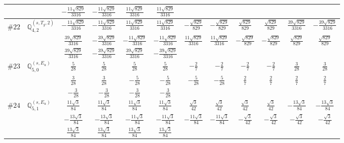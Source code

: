 \documentclass[fleqn,9pt,landscape]{jsarticle}
\begin{document}
\begin{center}
\begin{longtable}{lcccccccccc}
& $ - \frac{11 \sqrt{829}}{3316} $ & $ - \frac{11 \sqrt{829}}{3316} $ & $ \frac{11 \sqrt{829}}{3316} $ & $ \frac{11 \sqrt{829}}{3316} $ & $  $ & $  $ & $  $ & $  $ & $  $ & $  $ \\ \hline
$ \#22\quad \mathbb{Q}_{4,2}^{(s,T_{g},2)} $ & $ - \frac{11 \sqrt{829}}{3316} $ & $ - \frac{11 \sqrt{829}}{3316} $ & $ \frac{11 \sqrt{829}}{3316} $ & $ \frac{11 \sqrt{829}}{3316} $ & $ - \frac{\sqrt{829}}{829} $ & $ - \frac{\sqrt{829}}{829} $ & $ \frac{\sqrt{829}}{829} $ & $ \frac{\sqrt{829}}{829} $ & $ \frac{39 \sqrt{829}}{3316} $ & $ - \frac{39 \sqrt{829}}{3316} $ \\
& $ \frac{39 \sqrt{829}}{3316} $ & $ - \frac{39 \sqrt{829}}{3316} $ & $ - \frac{11 \sqrt{829}}{3316} $ & $ - \frac{11 \sqrt{829}}{3316} $ & $ \frac{11 \sqrt{829}}{3316} $ & $ \frac{11 \sqrt{829}}{3316} $ & $ - \frac{\sqrt{829}}{829} $ & $ - \frac{\sqrt{829}}{829} $ & $ \frac{\sqrt{829}}{829} $ & $ \frac{\sqrt{829}}{829} $ \\
& $ \frac{39 \sqrt{829}}{3316} $ & $ - \frac{39 \sqrt{829}}{3316} $ & $ \frac{39 \sqrt{829}}{3316} $ & $ - \frac{39 \sqrt{829}}{3316} $ & $  $ & $  $ & $  $ & $  $ & $  $ & $  $ \\ \hline
$ \#23\quad \mathbb{Q}_{5,0}^{(s,E_{u})} $ & $ \frac{5}{28} $ & $ \frac{5}{28} $ & $ \frac{5}{28} $ & $ \frac{5}{28} $ & $ - \frac{2}{7} $ & $ - \frac{2}{7} $ & $ - \frac{2}{7} $ & $ - \frac{2}{7} $ & $ \frac{3}{28} $ & $ \frac{3}{28} $ \\
& $ \frac{3}{28} $ & $ \frac{3}{28} $ & $ - \frac{5}{28} $ & $ - \frac{5}{28} $ & $ - \frac{5}{28} $ & $ - \frac{5}{28} $ & $ \frac{2}{7} $ & $ \frac{2}{7} $ & $ \frac{2}{7} $ & $ \frac{2}{7} $ \\
& $ - \frac{3}{28} $ & $ - \frac{3}{28} $ & $ - \frac{3}{28} $ & $ - \frac{3}{28} $ & $  $ & $  $ & $  $ & $  $ & $  $ & $  $ \\ \hline
$ \#24\quad \mathbb{Q}_{5,1}^{(s,E_{u})} $ & $ \frac{11 \sqrt{3}}{84} $ & $ \frac{11 \sqrt{3}}{84} $ & $ \frac{11 \sqrt{3}}{84} $ & $ \frac{11 \sqrt{3}}{84} $ & $ \frac{\sqrt{3}}{42} $ & $ \frac{\sqrt{3}}{42} $ & $ \frac{\sqrt{3}}{42} $ & $ \frac{\sqrt{3}}{42} $ & $ - \frac{13 \sqrt{3}}{84} $ & $ - \frac{13 \sqrt{3}}{84} $ \\
& $ - \frac{13 \sqrt{3}}{84} $ & $ - \frac{13 \sqrt{3}}{84} $ & $ - \frac{11 \sqrt{3}}{84} $ & $ - \frac{11 \sqrt{3}}{84} $ & $ - \frac{11 \sqrt{3}}{84} $ & $ - \frac{11 \sqrt{3}}{84} $ & $ - \frac{\sqrt{3}}{42} $ & $ - \frac{\sqrt{3}}{42} $ & $ - \frac{\sqrt{3}}{42} $ & $ - \frac{\sqrt{3}}{42} $ \\
& $ \frac{13 \sqrt{3}}{84} $ & $ \frac{13 \sqrt{3}}{84} $ & $ \frac{13 \sqrt{3}}{84} $ & $ \frac{13 \sqrt{3}}{84} $ & $  $ & $  $ & $  $ & $  $ & $  $ & $  $ \\
\end{longtable}
\end{center}
\end{document}
